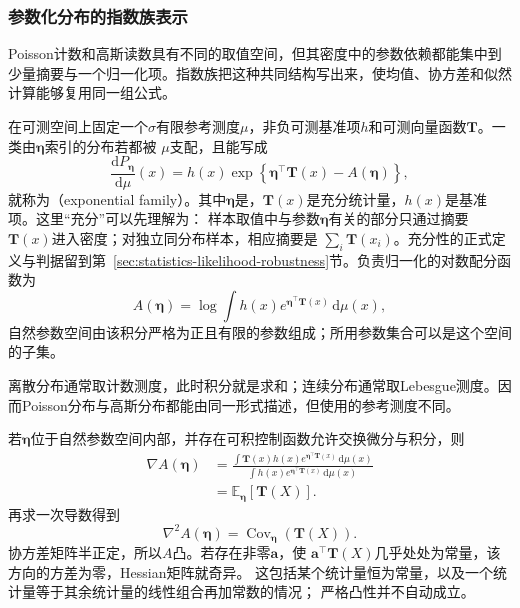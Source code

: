 \subsubsection{参数化分布的指数族表示}
Poisson计数和高斯读数具有不同的取值空间，但其密度中的参数依赖都能集中到少量摘要与一个归一化项。指数族把这种共同结构写出来，使均值、协方差和似然计算能够复用同一组公式。
\begin{definition}[指数族]
  \label{def:probability-exponential-family}
在可测空间上固定一个\(\sigma\)有限参考测度\(\mu\)，非负可测基准项\(h\)和可测向量函数\(\bm T\)。一类由\(\bm{\eta}\)索引的分布若都被
\(\mu\)支配，且能写成
\begin{equation}
  \frac{\mathrm{d}P_{\bm{\eta}}}{\mathrm{d}\mu}(x)
  =
  h(x)\exp\left\{
    \bm{\eta}^{\top}\bm{T}(x)-A(\bm{\eta})
  \right\},
  \label{eq:probability-exponential-family}
\end{equation}
就称为（exponential family）。其中\(\bm{\eta}\)是，\(\bm{T}(x)\)是充分统计量，\(h(x)\)是基准项。这里“充分”可以先理解为：
样本取值中与参数\(\bm{\eta}\)有关的部分只通过摘要\(\bm{T}(x)\)进入密度；对独立同分布样本，相应摘要是
\(\sum_i\bm{T}(x_i)\)。充分性的正式定义与判据留到第~\ref{sec:statistics-likelihood-robustness}节。负责归一化的对数配分函数为
\[ A(\bm{\eta})
  =\log\int h(x)e^{\bm{\eta}^{\top}\bm{T}(x)}\,\mathrm{d}\mu(x), \]
自然参数空间由该积分严格为正且有限的参数组成；所用参数集合可以是这个空间的子集。
\end{definition}
离散分布通常取计数测度，此时积分就是求和；连续分布通常取Lebesgue测度。因而Poisson分布与高斯分布都能由同一形式描述，但使用的参考测度不同。

若\(\bm{\eta}\)位于自然参数空间内部，并存在可积控制函数允许交换微分与积分，则
\[
\begin{aligned}
  \nabla A(\bm{\eta})
  &=
  \frac{\int \bm{T}(x)h(x)
  e^{\bm{\eta}^{\top}\bm{T}(x)}\,\mathrm{d}\mu(x)}
  {\int h(x)e^{\bm{\eta}^{\top}\bm{T}(x)}\,\mathrm{d}\mu(x)}\\
  &=
  \mathbb{E}_{\bm{\eta}}[\bm{T}(X)].
\end{aligned}
\]
再求一次导数得到
\begin{equation}
  \nabla^2 A(\bm{\eta})
  =
  \operatorname{Cov}_{\bm{\eta}}(\bm{T}(X)).
  \label{eq:probability-log-partition-hessian}
\end{equation}
协方差矩阵半正定，所以\(A\)凸。若存在非零\(\bm a\)，使
\(\bm a^\top\bm T(X)\)几乎处处为常量，该方向的方差为零，Hessian矩阵就奇异。
这包括某个统计量恒为常量，以及一个统计量等于其余统计量的线性组合再加常数的情况；
严格凸性并不自动成立。

